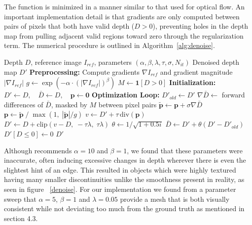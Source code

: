 \documentclass[10pt,twocolumn]{article}
\begin{document}
The function is minimized in a manner similar to that used for optical flow. An important  implementation detail is that gradients are only computed between pairs of pixels that both have valid depth ($D > 0$), preventing holes in the depth map from pulling adjacent valid regions toward zero through the regularization term. The numerical procedure is outlined in Algorithm~\ref{alg:denoise}.

\begin{algorithm}[H]
\caption{$g$-weighted TV-$L^1$ Depth Denoising}
\label{alg:denoise}
\begin{algorithmic}[1]
    \Require Depth $D$, reference image $I_{ref}$, 
             parameters $(\alpha, \beta, \lambda, \tau, \sigma, N_{it})$
    \Ensure Denoised depth map $D'$
    \Statex \textbf{Preprocessing:}
    \State Compute gradients $\nabla I_{ref}$ and gradient magnitude 
           $|\nabla I_{ref}|$
    \State $g \gets \exp\!\left(-\alpha \cdot 
           \left(|\nabla I_{ref}|\right)^\beta\right)$
    \State $M \gets \mathbf{1}[D > 0]$ 
    \Statex \textbf{Initialization:}
    \State $D' \gets D,\quad \bar{D} \gets D,\quad \mathbf{p} \gets \mathbf{0}$
    \Statex \textbf{Optimization Loop:}
        \State $D'_{old} \gets D'$
        \State $\nabla \bar{D} \gets $ forward differences of $\bar{D}$, 
               masked by $M$ between pixel pairs
        \State $\tilde{\mathbf{p}} \gets \mathbf{p} + \sigma \nabla \bar{D}$
        \State $\mathbf{p} \gets \tilde{\mathbf{p}} \;/\; 
               \max\!\left(1,\; |\tilde{\mathbf{p}}| / g\right)$
        \State $v \gets D' + \tau\, \mathrm{div}(\mathbf{p})$
        \State $D' \gets D + \mathrm{clip}(v - D,\; -\tau\lambda,\; \tau\lambda)$
        \State $\theta \gets 1 / \sqrt{1 + 0.5i}$
        \State $\bar{D} \gets D' + \theta(D' - D'_{old})$
    \EndFor
    \State $D'[D \leq 0] \gets 0$ 
    \State \Return $D'$
\end{algorithmic}
\end{algorithm}

Although \cite{newcombe2010} recommends $\alpha = 10$ and $\beta = 1$, we found that these parameters were inaccurate, often inducing excessive changes in depth wherever there is even the slightest hint of an edge. This resulted in objects which were highly textured having many smaller discontinuities unlike the smoothness present in reality, as seen in figure ~\ref{denoise}. For our implementation we found from a parameter sweep that $\alpha = 5$, $\beta = 1$ and $\lambda = 0.05$ provide a mesh that is both visually consistent while not deviating too much from the ground truth as mentioned in section 4.3.
\end{document}
